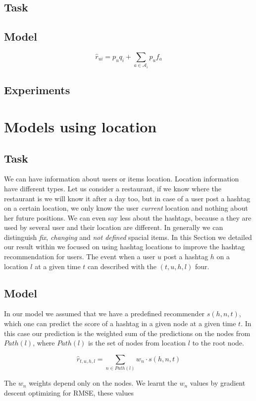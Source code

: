 \subsection{Task}
\subsection{Model}
\[\hat{r}_{ui}=p_u q_i+\sum_{a\in\mathcal{A}_i}p_u f_a\]
\subsection{Experiments}

\section{Models using location}
\subsection{Task}
We can have information about users or items location. Location information have different types. Let us 
consider a restaurant, if we know where the restaurant is we will know it after a day too, but in case of
a user post a hashtag on a certain location, we only know the user \emph{current} location and nothing about 
her future positions. We can even say less about the hashtags, because a they are used by several user
and their location are different. In generally we can distinguish \emph{fix}, \emph{changing} and 
\emph{not defined} spacial items. In this Section we detailed our result \cite{palovics1location}  within we 
focused on using hashtag locations to improve the  hashtag recommendation for users. The event when a user 
$u$ post a hashtag $h$ on a location $l$ at a given time $t$ can described with 
the $(t,u,h,l)$  four. 
\subsection{Model}
In our model we assumed that we have a predefined recommender $s\left(h,n,t\right)$,
which one can predict the score of a hashtag in a given node at a given time $t$. In this case our prediction 
is the weighted sum of the predictions on the nodes from $Path(l)$, where $Path(l)$ is the set of nodes from 
location $l$ to the root node.

\[\hat{r}_{t,u,h,l}=\sum_{n\in Path\left(l\right)}w_n\cdot s\left(h,n,t\right)\]

The $w_n$ weights depend only on the nodes. We learnt the $w_n$ values by gradient descent optimizing for RMSE, 
these values 

